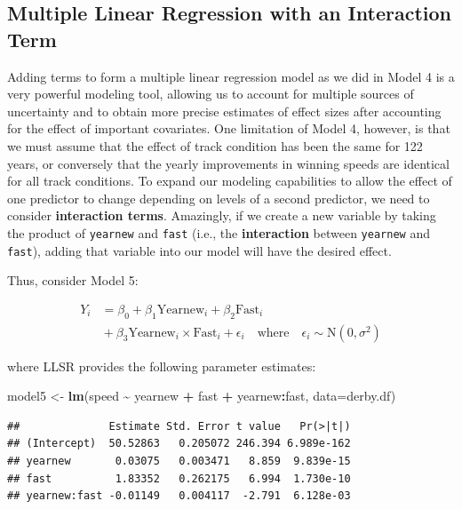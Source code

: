 \documentclass[
]{krantz}
\newenvironment{Shaded}{\begin{snugshade}}{\end{snugshade}}
\newcommand{\AttributeTok}[1]{\textcolor[rgb]{0.27,0.27,0.27}{#1}}
\newcommand{\FunctionTok}[1]{\textcolor[rgb]{0.27,0.27,0.27}{\textbf{#1}}}
\newcommand{\NormalTok}[1]{#1}
\newcommand{\OtherTok}[1]{\textcolor[rgb]{0.37,0.37,0.37}{#1}}
\newcommand{\SpecialCharTok}[1]{\textcolor[rgb]{0.43,0.43,0.43}{\textbf{#1}}}
\begin{document}
\subsection{Multiple Linear Regression with an Interaction Term}\label{multiple-linear-regression-with-an-interaction-term}

Adding terms to form a multiple linear regression model as we did in Model 4 is a very powerful modeling tool, allowing us to account for multiple sources of uncertainty and to obtain more precise estimates of effect sizes after accounting for the effect of important covariates. One limitation of Model 4, however, is that we must assume that the effect of track condition has been the same for 122 years, or conversely that the yearly improvements in winning speeds are identical for all track conditions. To expand our modeling capabilities to allow the effect of one predictor to change depending on levels of a second predictor, we need to consider \textbf{interaction terms}.  Amazingly, if we create a new variable by taking the product of \texttt{yearnew} and \texttt{fast} (i.e., the \textbf{interaction} between \texttt{yearnew} and \texttt{fast}), adding that variable into our model will have the desired effect.

Thus, consider Model 5:

\begin{equation*}
\begin{split}
Y_{i}&= \beta_{0}+\beta_{1}\textrm{Yearnew}_{i}+\beta_{2}\textrm{Fast}_{i} \\
      &{}+\beta_{3}\textrm{Yearnew}_{i}\times\textrm{Fast}_{i}+\epsilon_{i}\quad \textrm{where}\quad \epsilon_{i}\sim \textrm{N}(0,\sigma^2)
\end{split}
\end{equation*}

where LLSR provides the following parameter estimates:

\begin{Shaded}
\begin{Highlighting}[]
\NormalTok{model5 }\OtherTok{\textless{}{-}} \FunctionTok{lm}\NormalTok{(speed }\SpecialCharTok{\textasciitilde{}}\NormalTok{ yearnew }\SpecialCharTok{+}\NormalTok{ fast }\SpecialCharTok{+}\NormalTok{ yearnew}\SpecialCharTok{:}\NormalTok{fast, }
             \AttributeTok{data=}\NormalTok{derby.df)}
\end{Highlighting}
\end{Shaded}

\begin{verbatim}
##              Estimate Std. Error t value   Pr(>|t|)
## (Intercept)  50.52863   0.205072 246.394 6.989e-162
## yearnew       0.03075   0.003471   8.859  9.839e-15
## fast          1.83352   0.262175   6.994  1.730e-10
## yearnew:fast -0.01149   0.004117  -2.791  6.128e-03
\end{verbatim}
\end{document}
